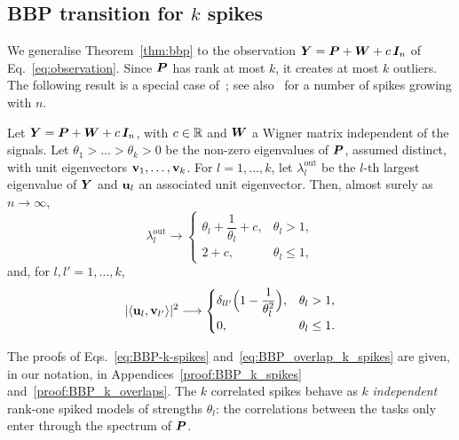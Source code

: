 \subsection{BBP transition for $k$ spikes} \label{sec:general_results}
We generalise Theorem~\ref{thm:bbp} to the observation $\bm{Y} = \bm{P} + \bm{W} + c\,\bm{I}_n$ of Eq.~\eqref{eq:observation}. Since $\bm{P}$ has rank at most $k$, it creates at most $k$ outliers. The following result is a special case of~\cite{benaych2011eigenvalues}; see also~\cite{bbp_paper} for a number of spikes growing with $n$.

\begin{theo}\label{thm:bbp_k}
Let $\bm{Y} = \bm{P} + \bm{W} + c\,\bm{I}_n$, with $c \in {\mathbb R}$ and $\bm{W}$ a Wigner matrix independent of the signals. Let $\theta_1 > \dots > \theta_k > 0$ be the non-zero eigenvalues of $\bm{P}$, assumed distinct, with unit eigenvectors $\boldsymbol{\mathbf{v}}_1, \dots, \boldsymbol{\mathbf{v}}_k$. For $l = 1,\dots,k$, let $\lambda_l^{\mathrm{out}}$ be the $l$-th largest eigenvalue of $\bm{Y}$ and $\boldsymbol{\mathbf{u}}_l$ an associated unit eigenvector. Then, almost surely as $n\to\infty$,
\begin{equation}
    \lambda_l^{\mathrm{out}} \longrightarrow
    \begin{cases}
        \theta_l + \dfrac{1}{\theta_l} + c, & \theta_l > 1 ,\\[6pt]
        2 + c, & \theta_l \le 1 ,
    \end{cases}
    \label{eq:BBP-k-spikes}
\end{equation}
and, for $l, l' = 1,\dots,k$,
\begin{equation}
    |\langle \boldsymbol{\mathbf{u}}_l, \boldsymbol{\mathbf{v}}_{l'} \rangle|^2 \longrightarrow
    \begin{cases}
        \delta_{ll'} \Big(1 - \dfrac{1}{\theta_l^{2}} \Big), & \theta_l > 1, \\[6pt]
        0, & \theta_l \le 1 .
    \end{cases}
    \label{eq:BBP_overlap_k_spikes}
\end{equation}
\end{theo}
\noindent
The proofs of Eqs.~\eqref{eq:BBP-k-spikes} and~\eqref{eq:BBP_overlap_k_spikes} are given, in our notation, in Appendices~\ref{proof:BBP_k_spikes} and~\ref{proof:BBP_k_overlaps}. The $k$ correlated spikes behave as $k$ \emph{independent} rank-one spiked models of strengths $\theta_l$: the correlations between the tasks only enter through the spectrum of $\bm{P}$.

